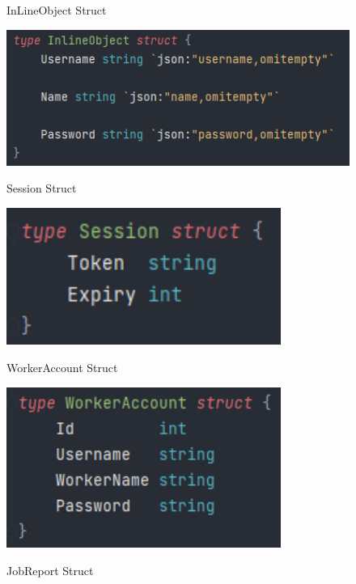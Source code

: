 \begin{figure}[H]
\begin{minipage}[b]{0.45\linewidth}
    \centering
    \caption{InLineObject Struct}
    \label{image:inLineObjectStruct}
    \includegraphics[width=1.0\textwidth]{images/horton/models/inlineobject_stuct.png}
    \caption{Session Struct}
    \label{image:sessionStruct}
    \includegraphics[width=0.8\textwidth]{images/horton/models/session_struct.png}
    \caption{WorkerAccount Struct}
    \label{image:workerStruct}
    \includegraphics[width=0.8\textwidth]{images/horton/models/worker_stuct.png}
\end{minipage}
\quad
\begin{minipage}[b]{0.45\linewidth}
    \caption{JobReport Struct}
    \label{image:reportStruct}

\end{minipage}
\end{figure}

